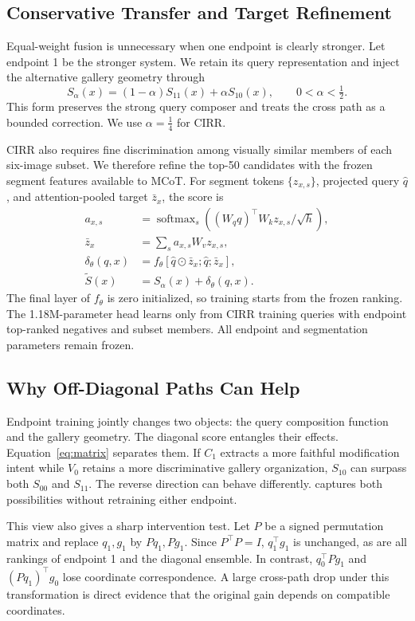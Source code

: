 \subsection{Conservative Transfer and Target Refinement}
\label{sec:conservative}

Equal-weight fusion is unnecessary when one endpoint is clearly stronger. Let endpoint 1 be the stronger system. We retain its query representation and inject the alternative gallery geometry through
\begin{equation}
S_{\alpha}(x)=(1-\alpha)S_{11}(x)+\alpha S_{10}(x), \qquad 0<\alpha<\tfrac{1}{2}.
\label{eq:weakpath}
\end{equation}
This form preserves the strong query composer and treats the cross path as a bounded correction. We use $\alpha=\tfrac{1}{4}$ for CIRR.

CIRR also requires fine discrimination among visually similar members of each six-image subset. We therefore refine the top-50 candidates with the frozen segment features available to MCoT. For segment tokens $\{z_{x,s}\}$, projected query $\hat q$, and attention-pooled target $\bar z_x$, the score is
\begin{equation}
\begin{aligned}
a_{x,s} &= \operatorname{softmax}_s
\left((W_q q)^{\top}W_k z_{x,s}/\sqrt h\right),\\
\bar z_x &= \sum_s a_{x,s}W_vz_{x,s},\\
\delta_\theta(q,x) &= f_\theta[\hat q\odot\bar z_x;\hat q;\bar z_x],\\
\widetilde S(x) &= S_{\alpha}(x)+\delta_\theta(q,x).
\end{aligned}
\label{eq:reranker}
\end{equation}
The final layer of $f_\theta$ is zero initialized, so training starts from the frozen ranking. The 1.18M-parameter head learns only from CIRR training queries with endpoint top-ranked negatives and subset members. All endpoint and segmentation parameters remain frozen.

\subsection{Why Off-Diagonal Paths Can Help}

Endpoint training jointly changes two objects: the query composition function and the gallery geometry. The diagonal score entangles their effects. Equation~\ref{eq:matrix} separates them. If $C_1$ extracts a more faithful modification intent while $V_0$ retains a more discriminative gallery organization, $S_{10}$ can surpass both $S_{00}$ and $S_{11}$. The reverse direction can behave differently. \method captures both possibilities without retraining either endpoint.

This view also gives a sharp intervention test. Let $P$ be a signed permutation matrix and replace $q_1,g_1$ by $Pq_1,Pg_1$. Since $P^\top P=I$, $q_1^\top g_1$ is unchanged, as are all rankings of endpoint 1 and the diagonal ensemble. In contrast, $q_0^\top Pg_1$ and $(Pq_1)^\top g_0$ lose coordinate correspondence. A large cross-path drop under this transformation is direct evidence that the original gain depends on compatible coordinates.
